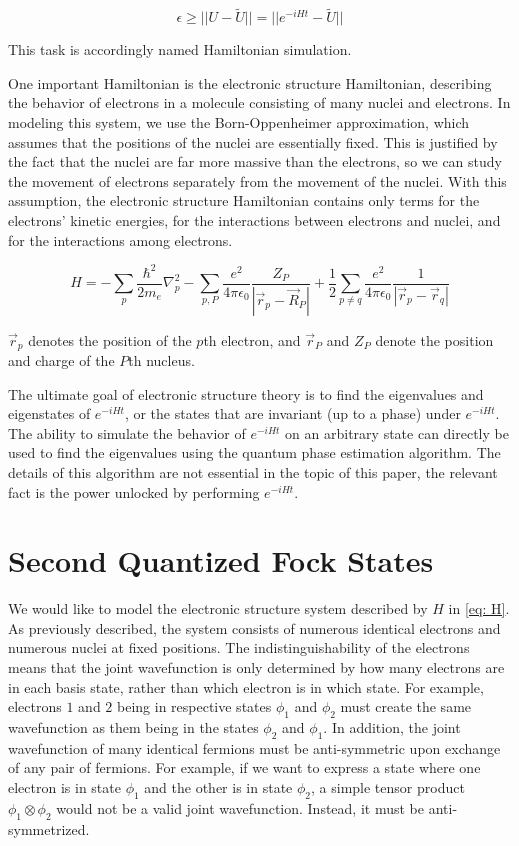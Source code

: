 \begin{equation}
    \epsilon \geq ||U - \tilde{U}|| = ||e^{-iHt} - \tilde{U}||
\end{equation}

This task is accordingly named Hamiltonian simulation.

One important Hamiltonian is the electronic structure Hamiltonian, describing the behavior of electrons in a molecule consisting of many nuclei and electrons. In modeling this system, we use the Born-Oppenheimer approximation, which assumes that the positions of the nuclei are essentially fixed. This is justified by the fact that the nuclei are far more massive than the electrons, so we can study the movement of electrons separately from the movement of the nuclei. With this assumption, the electronic structure Hamiltonian contains only terms for the electrons' kinetic energies, for the interactions between electrons and nuclei, and for the interactions among electrons.

\begin{equation}
    H = -\sum_p \frac{\hbar^2}{2m_e} \nabla^2_p - \sum_{p, P}\frac{e^2}{4\pi\epsilon_0}\frac{Z_P}{|\vec{r}_p - \vec{R}_P|} + \frac{1}{2}\sum_{p \neq q}\frac{e^2}{4\pi\epsilon_0}\frac{1}{|\vec{r}_p - \vec{r}_q|} \label{eq: H}
\end{equation}

$\vec{r}_p$ denotes the position of the $p$th electron, and $\vec{r}_P$ and $Z_P$ denote the position and charge of the $P$th nucleus.

The ultimate goal of electronic structure theory is to find the eigenvalues and eigenstates of $e^{-iHt}$, or the states that are invariant (up to a phase) under $e^{-iHt}$. The ability to simulate the behavior of $e^{-iHt}$ on an arbitrary state can directly be used to find the eigenvalues using the quantum phase estimation algorithm. The details of this algorithm are not essential in the topic of this paper, the relevant fact is the power unlocked by performing $e^{-iHt}$.

\section{Second Quantized Fock States}

We would like to model the electronic structure system described by $H$ in \eqref{eq: H}. As previously described, the system consists of numerous identical electrons and numerous nuclei at fixed positions. The indistinguishability of the electrons means that the joint wavefunction is only determined by how many electrons are in each basis state, rather than which electron is in which state. For example, electrons $1$ and $2$ being in respective states $\phi_1$ and $\phi_2$ must create the same wavefunction as them being in the states $\phi_2$ and $\phi_1$. In addition, the joint wavefunction of many identical fermions must be anti-symmetric upon exchange of any pair of fermions. For example, if we want to express a state where one electron is in state $\phi_1$ and the other is in state $\phi_2$, a simple tensor product $\phi_1 \otimes \phi_2$ would not be a valid joint wavefunction. Instead, it must be anti-symmetrized.

